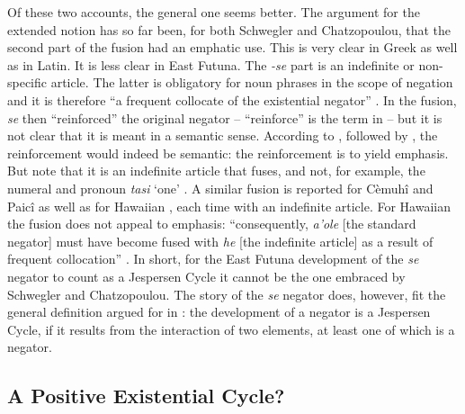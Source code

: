 ﻿\documentclass[output=paper,draft,draftmode,colorlinks,citecolor=brown]{langscibook}
\begin{document}
Of these two accounts, the general one seems better. The argument for the
extended notion has so far been, for both Schwegler
and Chatzopoulou, that
the second part of the fusion had an emphatic use. This is very clear in
Greek as well as in Latin. It is less clear in
East Futuna. The
\textit{-se} part is an indefinite or non-specific article. The latter is
obligatory for noun phrases in the scope of negation and it is therefore ``a
frequent collocate of the existential negator''
\parencite[1348]{Veselinova2014}. In the fusion, \textit{se} then
``reinforced'' the original negator -- ``reinforce'' is the term in
\textcite[122]{MoyseFaurie1999} -- but it is not clear that it is meant in a
semantic sense. According to \textcite[18]{Mosel1999}, followed by
\textcite[1363]{Veselinova2014}, the reinforcement would indeed be
semantic: the reinforcement is to yield emphasis. But note that it is an
indefinite article that fuses, and not, for example, the numeral and
pronoun \textit{tasi} `one' \parencites[27,
35]{MoyseFaurie1997}[121]{MoyseFaurie1999}. A similar fusion is reported
for Cèmuhî and Paicî \parencite[63]{MoyseFaurieOzanneRivierre1999} as well
as for Hawaiian \parencite[1348]{Veselinova2014}, each time with an
indefinite article. For
Hawaiian the fusion does not appeal to emphasis: ``consequently,
\textit{a'ole} [the standard negator] must have become fused with
\textit{he} [the indefinite article] as a result of frequent
collocation'' \parencite[1348]{Veselinova2014}. In short, for the East Futuna
development of the \textit{se} negator to count as a Jespersen Cycle it cannot be
the one embraced by Schwegler and
Chatzopoulou. The story of the
\textit{se} negator does, however, fit the general definition argued for in
: the development of a negator is a Jespersen Cycle, if it results
from the interaction of two elements, at least one of which is a negator.

\subsection{A Positive Existential Cycle?}\label{sec:int-4.3}
\end{document}
